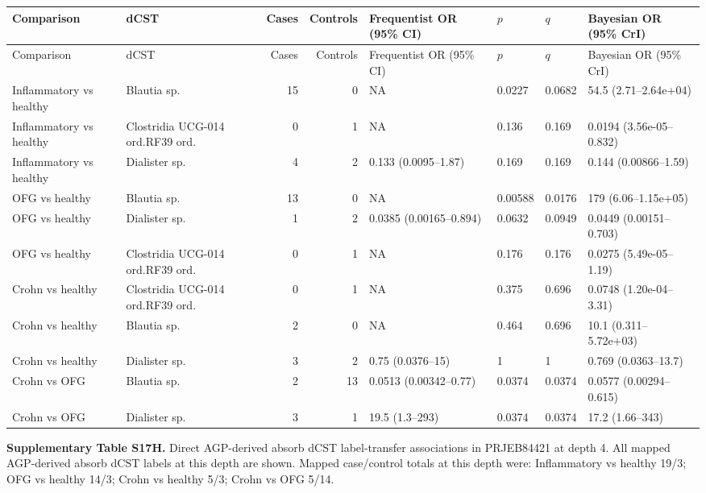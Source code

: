 \begingroup
\scriptsize
\setlength{\tabcolsep}{3pt}
\setlength{\LTleft}{0pt}
\setlength{\LTright}{0pt}
\begin{longtable}{@{} p{} p{} r r p{} p{} p{} p{} @{}}
\toprule
Comparison & dCST & Cases & Controls & Frequentist OR (95\% CI) & \(p\) & \(q\) & Bayesian OR (95\% CrI) \\
\midrule
\endfirsthead
\toprule
Comparison & dCST & Cases & Controls & Frequentist OR (95\% CI) & \(p\) & \(q\) & Bayesian OR (95\% CrI) \\
\midrule
\endhead
\bottomrule
\endfoot
Inflammatory vs healthy & Blautia sp. & 15 & 0 & NA & 0.0227 & 0.0682 & 54.5 (2.71--2.64e+04) \\
Inflammatory vs healthy & Clostridia UCG-014 ord.\dcstsep RF39 ord. & 0 & 1 & NA & 0.136 & 0.169 & 0.0194 (3.56e-05--0.832) \\
Inflammatory vs healthy & Dialister sp. & 4 & 2 & 0.133 (0.0095--1.87) & 0.169 & 0.169 & 0.144 (0.00866--1.59) \\
OFG vs healthy & Blautia sp. & 13 & 0 & NA & 0.00588 & 0.0176 & 179 (6.06--1.15e+05) \\
OFG vs healthy & Dialister sp. & 1 & 2 & 0.0385 (0.00165--0.894) & 0.0632 & 0.0949 & 0.0449 (0.00151--0.703) \\
OFG vs healthy & Clostridia UCG-014 ord.\dcstsep RF39 ord. & 0 & 1 & NA & 0.176 & 0.176 & 0.0275 (5.49e-05--1.19) \\
Crohn vs healthy & Clostridia UCG-014 ord.\dcstsep RF39 ord. & 0 & 1 & NA & 0.375 & 0.696 & 0.0748 (1.20e-04--3.31) \\
Crohn vs healthy & Blautia sp. & 2 & 0 & NA & 0.464 & 0.696 & 10.1 (0.311--5.72e+03) \\
Crohn vs healthy & Dialister sp. & 3 & 2 & 0.75 (0.0376--15) & 1 & 1 & 0.769 (0.0363--13.7) \\
Crohn vs OFG & Blautia sp. & 2 & 13 & 0.0513 (0.00342--0.77) & 0.0374 & 0.0374 & 0.0577 (0.00294--0.615) \\
Crohn vs OFG & Dialister sp. & 3 & 1 & 19.5 (1.3--293) & 0.0374 & 0.0374 & 17.2 (1.66--343) \\
\end{longtable}
\endgroup
\bigskip

\noindent\textbf{Supplementary Table S17H.} Direct AGP-derived absorb dCST label-transfer associations in PRJEB84421 at depth 4. All mapped AGP-derived absorb dCST labels at this depth are shown. Mapped case/control totals at this depth were: Inflammatory vs healthy 19/3; OFG vs healthy 14/3; Crohn vs healthy 5/3; Crohn vs OFG 5/14.

